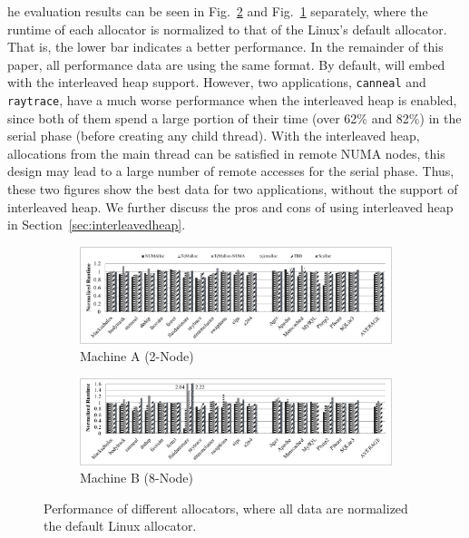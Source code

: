  he evaluation results can be seen in Fig.~\ref{8node-parsec-perf} and Fig.~\ref{2node-parsec-perf} separately, where the runtime of each allocator is normalized to that of the Linux's default  allocator. That is, the lower bar indicates a better performance. In the remainder of this paper, all performance data are using the same format. By default, \NM{} will embed with the interleaved heap support. However, two applications, \texttt{canneal} and \texttt{raytrace}, have a much worse performance when the interleaved heap is enabled, since both of them spend a large portion of their time (over 62\% and 82\%) in the serial phase (before creating any child thread). With the interleaved heap,  allocations from the main thread can be satisfied in remote NUMA nodes, this design may lead to a large number of remote accesses for the serial phase. Thus, these two figures show the best data for two applications, without the support of interleaved heap. We further discuss the pros and cons of using interleaved heap in Section~\ref{sec:interleavedheap}.  


\begin{figure}[!ht]
    \centering
    \begin{subfigure}{0.9\textwidth}
    \includegraphics[width=\textwidth]{figure/2-node-parsec-perf.pdf}
    \caption{Machine A (2-Node)\label{2node-parsec-perf}}
    \end{subfigure}
    
	\vspace{0.1in}  
	
	\begin{subfigure}{0.9\textwidth}    \includegraphics[width=\textwidth]{figure/8-node-parsec-perf.pdf}
    \caption{Machine B (8-Node)\label{8node-parsec-perf}}
    \end{subfigure}
    \caption{Performance of different allocators, where all data are normalized the default Linux allocator. \label{sec:perf}}
 \end{figure}


